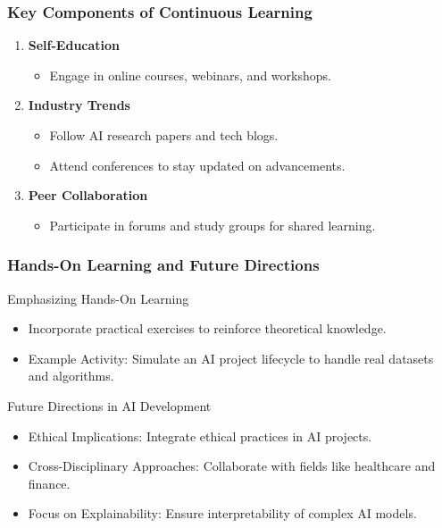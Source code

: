 \documentclass[aspectratio=169]{beamer}
\begin{document}
\begin{frame}[fragile]
    \frametitle{Key Components of Continuous Learning}
    \begin{enumerate}
        \item \textbf{Self-Education}
            \begin{itemize}
                \item Engage in online courses, webinars, and workshops.
            \end{itemize}
        
        \item \textbf{Industry Trends}
            \begin{itemize}
                \item Follow AI research papers and tech blogs.
                \item Attend conferences to stay updated on advancements.
            \end{itemize}
        
        \item \textbf{Peer Collaboration}
            \begin{itemize}
                \item Participate in forums and study groups for shared learning.
            \end{itemize}
    \end{enumerate}
\end{frame}

\begin{frame}[fragile]
    \frametitle{Hands-On Learning and Future Directions}
    \begin{block}{Emphasizing Hands-On Learning}
        \begin{itemize}
            \item Incorporate practical exercises to reinforce theoretical knowledge.
            \item Example Activity: Simulate an AI project lifecycle to handle real datasets and algorithms.
        \end{itemize}
    \end{block}

    \begin{block}{Future Directions in AI Development}
        \begin{itemize}
            \item Ethical Implications: Integrate ethical practices in AI projects.
            \item Cross-Disciplinary Approaches: Collaborate with fields like healthcare and finance.
            \item Focus on Explainability: Ensure interpretability of complex AI models.
        \end{itemize}
    \end{block}
\end{frame}
\end{document}

